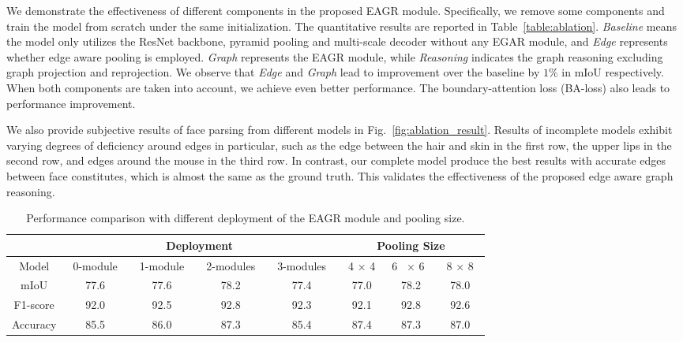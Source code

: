 \documentclass[runningheads]{llncs}
\begin{document}
We demonstrate the effectiveness of different components in the proposed EAGR module. 
Specifically, we remove some components and train the model from scratch under the same initialization. 
The quantitative results are reported in Table~\ref{table:ablation}. {\it Baseline} means the model only utilizes the ResNet backbone, pyramid pooling and multi-scale decoder without any EGAR module, and {\it Edge} represents whether edge aware pooling is employed.
{\it Graph} represents the EAGR module, while {\it Reasoning} indicates the graph reasoning excluding graph projection and reprojection. 
We observe that {\it Edge} and {\it Graph} lead to improvement over the baseline by $1\%$ in mIoU respectively. 
When both components are taken into account, we achieve even better performance. 
The boundary-attention loss (BA-loss) also leads to performance improvement. 

We also provide subjective results of face parsing from different models in Fig.~\ref{fig:ablation_result}.
Results of incomplete models exhibit varying degrees of deficiency around edges in particular, such as the edge between the hair and skin in the first row, the upper lips in the second row, and edges around the mouse in the third row. 
In contrast, our complete model produce the best results with accurate edges between face constitutes, which is almost the same as the ground truth. 
This validates the effectiveness of the proposed edge aware graph reasoning. 

\begin{table}[t]
\centering
\caption{Performance comparison with different deployment of the EAGR module and pooling size.}
\label{table:modules}
\begin{tabular}{c|c|c|c|c|c|c|c}
\toprule
\begin{minipage}{2cm} \centering  \end{minipage} & \multicolumn{4}{c|}{Deployment} & \multicolumn{3}{c}{Pooling Size} \\
\hline
Model & ~0-module~ & ~1-module~ & ~2-modules~ & ~3-modules~ &  ~4 $\times$ 4~ & 6 ~$\times$ 6~ & ~8 $\times$ 8~ \\ 
\hline
mIoU      & 77.6 & 77.6 &  78.2 & 77.4 &  77.0 & 78.2 & 78.0 \\ 
F1-score    & 92.0 & 92.5 & 92.8 & 92.3 &  92.1 & 92.8 & 92.6 \\ 
Accuracy & 85.5 & 86.0 & 87.3 & 85.4 &  87.4 & 87.3 & 87.0\\ 
\bottomrule

\end{tabular}
\end{table}
\end{document}

